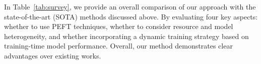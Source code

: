 \documentclass[lettersize,journal]{IEEEtran}
\begin{document}

{In Table~\ref{tab:survey}, we provide an overall comparison of our approach with the state-of-the-art (SOTA) methods discussed above. By evaluating four key aspects: whether to use PEFT techniques, whether to consider resource and model heterogeneity, and whether incorporating a dynamic training strategy based on training-time model performance. Overall, our method demonstrates clear advantages over existing works.}
\end{document}
